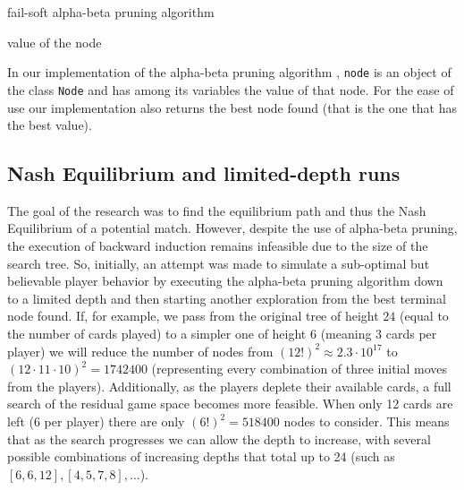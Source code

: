 \documentclass[conference]{IEEEtran}
\begin{document}
\begin{algorithm}
\label{alg:alphabeta}
  \makeatletter
  \renewcommand{\ALG@name}{alphabeta}
  \makeatother
  \renewcommand{\thealgorithm}{} %
\caption{fail-soft alpha-beta pruning algorithm}
\begin{algorithmic}
\renewcommand{\algorithmicrequire}{\textbf{Input:}}
\renewcommand{\algorithmicensure}{\textbf{Output:}}
    \RETURN value of the node
\ENDIF
{}
        \ENDIF
    \ENDFOR
\ELSE
        \ENDIF
    \ENDFOR
\ENDIF
\end{algorithmic} 
\end{algorithm}

In our implementation of the alpha-beta pruning algorithm \cite{repository}, \verb|node| is an object of the class \verb|Node| and has among its variables the value of that node. For the ease of use our implementation also returns the best node found (that is the one that has the best value).

\subsection{ Nash Equilibrium and limited-depth runs}
The goal of the research was to find the equilibrium path and thus the Nash Equilibrium of a potential match. However, despite the use of alpha-beta pruning, the execution of backward induction remains infeasible due to the size of the search tree. So, initially, an attempt was made to simulate a sub-optimal but believable player behavior by executing the alpha-beta pruning algorithm down to a limited depth and then starting another exploration from the best terminal node found. If, for example, we pass from the original tree of height $24$ (equal to the number of cards played) to a simpler one of height $6$ (meaning $3$ cards per player) we will reduce the number of nodes from $(12!)^2 \approx 2.3 \cdot 10^{17}$ to $(12\cdot 11\cdot 10)^2=1742400$ (representing every combination of three initial moves from the players). Additionally, as the players deplete their available cards, a full search of the residual game space becomes more feasible. When only 12 cards are left (6 per player) there are only $(6!)^2 = 518400$ nodes to consider. This means that as the search progresses we can allow the depth to increase, with several possible combinations of increasing depths that total up to 24 (such as $[6,6,12], [4,5,7,8], \dots$).
\end{document}
